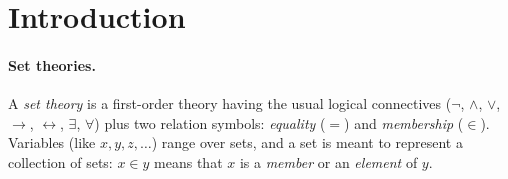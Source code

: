 \documentclass[sigplan,10pt,anonymous,review]{acmart}%
\begin{document}



\maketitle

\section{Introduction}


\paragraph{Set theories.}
A \emph{set theory} is a first-order theory having the usual logical connectives ($\neg$, $\land$, $\lor$, $\to$, $\leftrightarrow$, $\exists$, $\forall$) plus two relation symbols: \emph{equality} ($=$) and \emph{membership} ($\in$). Variables (like $x,y,z,\ldots$) range over sets, and a set is meant to represent a collection of sets: $x \in y$ means that $x$ is a \emph{member} or an \emph{element} of $y$.
\end{document}
